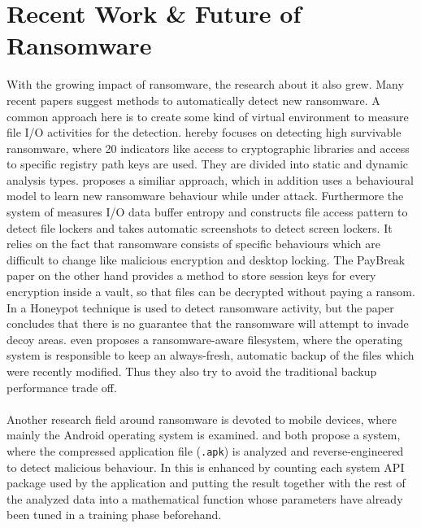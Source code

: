 \section{Recent Work \& Future of Ransomware}

With the growing impact of ransomware, the research about it also grew. Many recent papers suggest methods to automatically detect new ransomware. A common approach here is to create some kind of virtual environment to measure file I/O activities for the detection. \cite{Ahmadian2016} hereby focuses on detecting high survivable ransomware, where 20 indicators like access to cryptographic libraries and access to specific registry path keys are used. They are divided into static and dynamic analysis types. \cite{Shukla2016} proposes a similiar approach, which in addition uses a behavioural model to learn new ransomware behaviour while under attack. Furthermore the system of \cite{Kirda2017} measures I/O data buffer entropy and constructs file access pattern to detect file lockers and takes automatic screenshots to detect screen lockers. It relies on the fact that ransomware consists of specific behaviours which are difficult to change like malicious encryption and desktop locking. The PayBreak paper \cite{Kolodenker2017} on the other hand provides a method to store session keys for every encryption inside a vault, so that files can be decrypted without paying a ransom. In \cite{Moore2016} a Honeypot technique is used to detect ransomware activity, but the paper concludes that there is no guarantee that the ransomware will attempt to invade decoy areas. \cite{Continella2016} even proposes a ransomware-aware filesystem, where the operating system is responsible to keep an always-fresh, automatic backup of the files which were recently modified. Thus they also try to avoid the traditional backup performance trade off.\\
\\
Another research field around ransomware is devoted to mobile devices, where mainly the Android operating system is examined. \cite{Yang2015} and \cite{Andronio2015} both propose a system, where the compressed application file (\texttt{.apk}) is analyzed and reverse-engineered to detect malicious behaviour. In \cite{Maiorca2017} this is enhanced by counting each system API package used by the application and putting the result together with the rest of the analyzed data into a mathematical function whose parameters have already been tuned in a training phase beforehand.\\
\\
